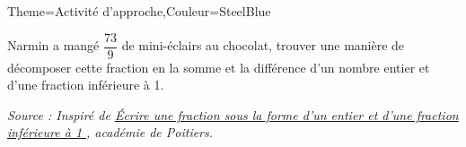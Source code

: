 \begin{Maquette}[Cours]{Theme={Activité d'approche},Couleur={SteelBlue}}
\begin{AActivite}
         Narmin a mangé $\dfrac{73}9$ de mini-éclairs au chocolat, trouver une manière de décomposer cette fraction en la somme et la différence d'un nombre entier et d'une fraction inférieure à 1. \par
         \vspace*{1.8cm}

      \end{AActivite}

   \vfill\hfill{\it\footnotesize Source : Inspiré de \href{http://ww2.ac-poitiers.fr/dsden86-pedagogie/sites/dsden86-pedagogie/IMG/pdf/groupe4_c13.pdf}{\og Écrire une fraction sous la forme d'un entier et d'une fraction inférieure à 1 \fg}, académie de Poitiers.}

\end{Maquette}


